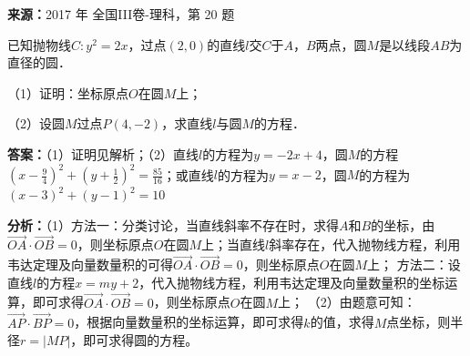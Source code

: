 \begin{question}[points=12]
\textbf{来源：}2017 年 全国III卷-理科，第 20 题\par
已知抛物线$C:y^2=2x$，过点$(2,0)$的直线$l$交$C$于$A$，$B$两点，圆$M$是以线段$AB$为直径的圆．

（1）证明：坐标原点$O$在圆$M$上；

（2）设圆$M$过点$P(4,-2)$，求直线$l$与圆$M$的方程．
\begin{solution}
\textbf{答案：}（1）证明见解析；（2）直线$l$的方程为$y=-2x+4$，圆$M$的方程$(x-\frac{9}{4})^2+(y+\frac{1}{2})^2=\frac{85}{16}$；或直线$l$的方程为$y=x-2$，圆$M$的方程为$(x-3)^2+(y-1)^2=10$

\textbf{分析：}（1）方法一：分类讨论，当直线斜率不存在时，求得$A$和$B$的坐标，由$\overrightarrow{OA}\cdot\overrightarrow{OB}=0$，则坐标原点$O$在圆$M$上；当直线$l$斜率存在，代入抛物线方程，利用韦达定理及向量数量积的可得$\overrightarrow{OA}\cdot\overrightarrow{OB}=0$，则坐标原点$O$在圆$M$上；
方法二：设直线$l$的方程$x=my+2$，代入抛物线方程，利用韦达定理及向量数量积的坐标运算，即可求得$\overrightarrow{OA}\cdot\overrightarrow{OB}=0$，则坐标原点$O$在圆$M$上；
（2）由题意可知：$\overrightarrow{AP}\cdot\overrightarrow{BP}=0$，根据向量数量积的坐标运算，即可求得$k$的值，求得$M$点坐标，则半径$r=|MP|$，即可求得圆的方程。


\end{solution}
\end{question}
